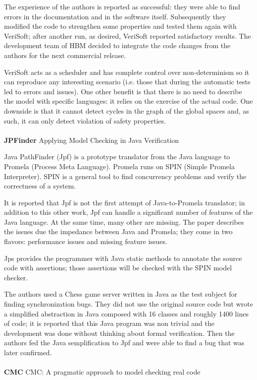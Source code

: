 The experience of the authors is reported as successful: they were able to find errors in the documentation and in the software itself. Subsequently they modified the code to strengthen some properties and tested them again with VeriSoft; after another run, as desired, VeriSoft reported satisfactory results.
The development team of HBM decided to integrate the code changes from the authors for the next commercial release.

VeriSoft acts as a scheduler and has complete control over non-determinism so it can reproduce any interesting scenario (i.e. those that during the automatic tests led to errors and issues).
One other benefit is that there is no need to describe the model with specific languages: it relies on the exercise of the actual code.
One downside is that it cannot detect cycles in the graph of the global spaces and, as such, it can only detect violation of safety properties.
\\
\\
\textbf{JPFinder} \cite{havelund1999applying} Applying Model Checking in Java Verification

Java PathFinder (Jpf) is a prototype translator from the Java language to Promela (Process Meta Language). Promela runs on SPIN (Simple Promela Interpreter).
SPIN is a general tool to find concurrency problems and verify the correctness of a system.

It is reported that Jpf is not the first attempt of Java-to-Promela translator; in addition to this other work, Jpf can handle a significant number of features of the Java language. At the same time, many other are missing.
The paper describes the issues due the impedance between Java and Promela; they come in two flavors: performance issues and missing feature issues.

Jps provides the programmer with Java static methods to annotate the source code with assertions; those assertions will be checked with the SPIN model checker.

The authors used a Chess game server written in Java as the test subject for finding synchronization bugs. They did not use the original source code but wrote a simplified abstraction in Java composed with 16 classes and roughly 1400 lines of code; it is reported that this Java program was non trivial and the development was done without thinking about formal verification.
Then the authors fed the Java semplification to Jpf and were able to find a bug that was later confirmed. 
\\
\\
\textbf{CMC} \cite{musuvathi2002cmc} CMC: A pragmatic approach to model checking real code

